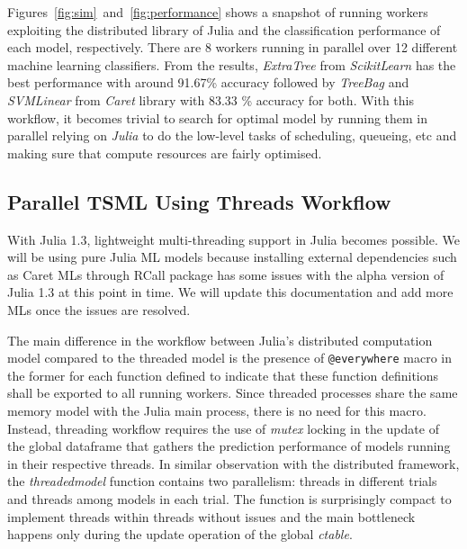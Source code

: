\documentclass{juliacon}
\begin{document}
Figures~\ref{fig:sim}~and~\ref{fig:performance}  shows a snapshot of running workers exploiting the distributed library of Julia and the classification performance of each model, respectively. There are 8 workers running in parallel over 12 different machine learning classifiers. From the results, \emph{ExtraTree} from \emph{ScikitLearn} has the best performance with around 91.67\% accuracy followed by \emph{TreeBag} and \emph{SVMLinear} from \emph{Caret} library with 83.33 \% accuracy for both. With this workflow, it becomes trivial to search for optimal model by running them in parallel relying on \emph{Julia} to do the low-level tasks of scheduling, queueing, etc and making sure that compute resources are fairly optimised.

\subsection{Parallel TSML Using Threads Workflow}
With Julia 1.3, lightweight multi-threading support in Julia becomes possible. We will be using pure Julia ML models because installing external dependencies such as Caret MLs through RCall package has some issues with the alpha version of Julia 1.3 at this point in time. We will update this documentation and add more MLs once the issues are resolved.

\vskip 6pt

The main difference in the workflow between Julia's distributed computation model compared to the threaded model is the presence of \texttt{@everywhere} macro in the former for each function defined to indicate that these function definitions shall be exported to all running workers. Since threaded processes share the same memory model with the Julia main process, there is no need for this macro. Instead, threading workflow requires the use of \emph{mutex} locking in the update of the global dataframe that gathers the prediction performance of models running in their respective threads. In similar observation with the distributed framework, the \emph{threadedmodel} function contains two parallelism: threads in different trials and threads among models in each trial. The function is surprisingly compact to implement threads within threads without issues and the main bottleneck happens only during the update operation of the global \emph{ctable}.
\end{document}
